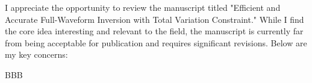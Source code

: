 \begin{pointGen}
	I appreciate the opportunity to review the manuscript titled "Efficient and Accurate Full-Waveform Inversion with Total Variation Constraint." While I find the core idea interesting and relevant to the field, the manuscript is currently far from being acceptable for publication and requires significant revisions. Below are my key concerns:
\end{pointGen}

\begin{reply}
BBB
\end{reply}